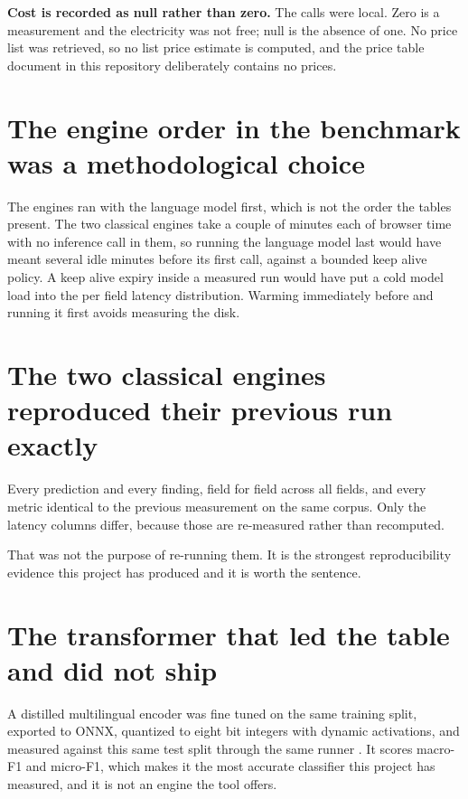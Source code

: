 \textbf{Cost is recorded as null rather than zero.} The calls were local. Zero is
a measurement and the electricity was not free; null is the absence of one. No
price list was retrieved, so no list price estimate is computed, and the price
table document in this repository deliberately contains no prices.

\section{The engine order in the benchmark was a methodological choice}

The engines ran with the language model first, which is not the order the tables
present. The two classical engines take a couple of minutes each of browser time
with no inference call in them, so running the language model last would have
meant several idle minutes before its first call, against a bounded keep alive
policy. A keep alive expiry inside a measured run would have put a cold model
load into the per field latency distribution. Warming immediately before and
running it first avoids measuring the disk.

\section{The two classical engines reproduced their previous run exactly}

Every prediction and every finding, field for field across all \vTestFields{}
fields, and every metric identical to the previous measurement on the same
corpus. Only the latency columns differ, because those are re-measured rather
than recomputed.

That was not the purpose of re-running them. It is the strongest reproducibility
evidence this project has produced and it is worth the sentence.

\section{The transformer that led the table and did not ship}
\label{sec:transformer-rung}

A distilled multilingual encoder was fine tuned on the same training split,
exported to ONNX, quantized to eight bit integers with dynamic activations, and
measured against this same test split through the same runner
\cite{onnxruntime-quantization}. It scores \vBertMacroF{} macro-F1 and
\vBertMicroF{} micro-F1, which makes it the most accurate classifier this project
has measured, and it is not an engine the tool offers.

